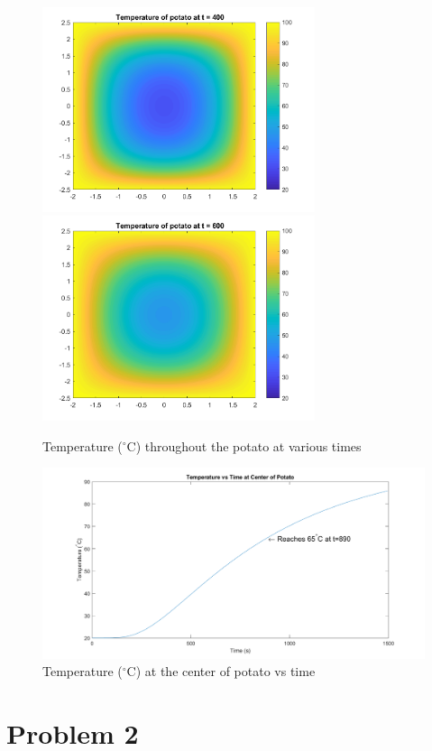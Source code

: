 \documentclass[12pt]{article}
\begin{document}
\begin{figure}[htb]%
    \centering
    {\includegraphics[width=8cm]{Problem1_fig3.png}}%
    \qquad
    {\includegraphics[width=8cm]{Problem1_fig4.png}}%
    \label{fig:fig3 and fig4}%
    \caption*{Temperature ($^{\circ}$C) throughout the potato at various times}
\end{figure}

\begin{figure}[htb]
\centering
\includegraphics[width=1\textwidth]{Problem1_fig5.png}
\caption*{Temperature ($^{\circ}$C) at the center of potato vs time}
\label{fig::fig5}
\end{figure}

\section*{Problem 2}\label{sec::Problem2}
\end{document}
